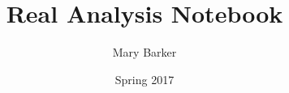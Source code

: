 \documentclass[11pt,rightpage,a4paper]{memoir}
\title{Real Analysis Notebook}
\author{Mary Barker}
\date{Spring 2017}
\theoremstyle{thm}
\theoremstyle{problems}
\begin{document}
	\begin{titlingpage}
		\maketitle
	\end{titlingpage}

	
	
	
	
	
	
\end{document}
